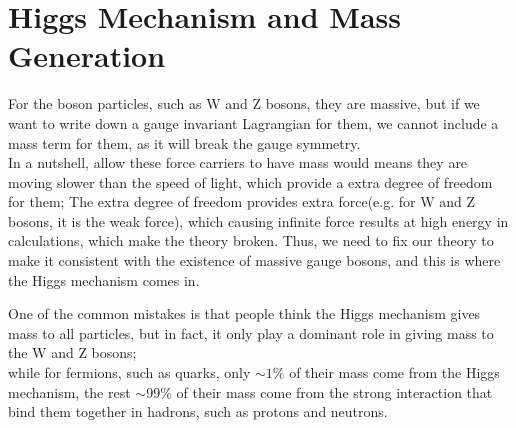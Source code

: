 \section{Higgs Mechanism and Mass Generation}
\begin{intuition}
    For the boson particles, such as W and Z bosons, they are massive, but if we want to write down a gauge invariant Lagrangian for them, we cannot include a mass term for them, as it will break the gauge symmetry. \\

    In a nutshell, allow these force carriers to have mass would means they are moving slower than the speed of light, which provide a extra degree of freedom for them; 
    The extra degree of freedom provides extra force(e.g. for W and Z bosons, it is the weak force), which causing infinite force results at high energy in calculations, which make the theory broken. Thus, we need to fix our theory to make it consistent with the existence of massive gauge bosons, and this is where the Higgs mechanism comes in.
\end{intuition}

\begin{importantnote}
    One of the common mistakes is that people think the Higgs mechanism gives mass to all particles, but in fact, it only play a dominant role in giving mass to the W and Z bosons; \\

    while for fermions, such as quarks, only $\sim 1\%$ of their mass come from the Higgs mechanism, the rest $\sim 99\%$ of their mass come from the strong interaction that bind them together in hadrons, such as protons and neutrons.
\end{importantnote}


